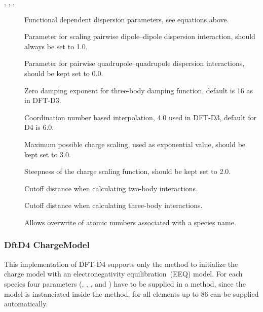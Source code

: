 \begin{description}
\item[, , , ] Functional dependent dispersion
  parameters, see equations above.
  
\item[] Parameter for scaling pairwise dipole--dipole dispersion
  interaction, should always be set to 1.0.

\item[] Parameter for pairwise quadrupole--quadrupole dispersion
  interactions, should be kept set to 0.0.

\item[] Zero damping exponent for three-body damping function, default
  is 16 as in DFT-D3.

\item[] Coordination number based interpolation, 4.0 used in
  DFT-D3, default for D4 is 6.0.

\item[] Maximum possible charge scaling, used as exponential
  value, should be kept set to 3.0.

\item[] Steepness of the charge scaling function, should be
  kept set to 2.0.

\item[]  Cutoff distance when
  calculating two-body interactions.

\item[]  Cutoff distance when
  calculating three-body interactions.

\item[]
  Allows overwrite of atomic numbers associated with a species name.

\end{description}

\subsubsection{DftD4 ChargeModel}
\label{sec:dftbp.ChargeModel}

This implementation of DFT-D4 supports only the  method to initialize
the charge model with an electronegativity equilibration~(EEQ) model.\cite{rappe1991}
For each species four parameters (, , , and )
have to be supplied in a  method, since the model
is instanciated inside the  method,  for all elements
up to 86 can be supplied automatically.\cite{caldeweyher-jcp-150-154122}


